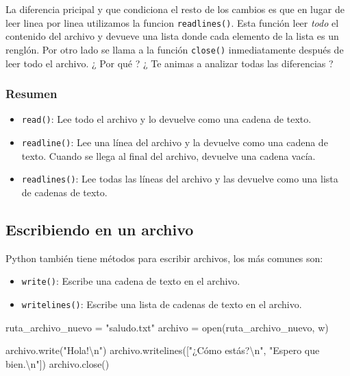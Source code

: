 \documentclass[
  letterpaper,
  DIV=11,
  numbers=noendperiod]{scrreprt}
\newenvironment{Shaded}{\begin{snugshade}}{\end{snugshade}}
\newcommand{\BuiltInTok}[1]{\textcolor[rgb]{0.00,0.23,0.31}{#1}}
\newcommand{\CharTok}[1]{\textcolor[rgb]{0.13,0.47,0.30}{#1}}
\newcommand{\NormalTok}[1]{\textcolor[rgb]{0.00,0.23,0.31}{#1}}
\newcommand{\OperatorTok}[1]{\textcolor[rgb]{0.37,0.37,0.37}{#1}}
\newcommand{\StringTok}[1]{\textcolor[rgb]{0.13,0.47,0.30}{#1}}
\providecommand{\tightlist}{%
  \setlength{\itemsep}{0pt}\setlength{\parskip}{0pt}}\usepackage{longtable,booktabs,array}
\begin{document}
La diferencia pricipal y que condiciona el resto de los cambios es que
en lugar de leer linea por linea utilizamos la funcion
\texttt{readlines()}. Esta función leer \emph{todo} el contenido del
archivo y devueve una lista donde cada elemento de la lista es un
renglón. Por otro lado se llama a la función \texttt{close()}
inmediatamente después de leer todo el archivo. ¿ Por qué ? ¿ Te animas
a analizar todas las diferencias ?

\subsubsection{Resumen}\label{resumen}

\begin{itemize}
\tightlist
\item
  \texttt{read()}: Lee todo el archivo y lo devuelve como una cadena de
  texto.
\item
  \texttt{readline()}: Lee una línea del archivo y la devuelve como una
  cadena de texto. Cuando se llega al final del archivo, devuelve una
  cadena vacía.
\item
  \texttt{readlines()}: Lee todas las líneas del archivo y las devuelve
  como una lista de cadenas de texto.
\end{itemize}

\subsection{Escribiendo en un archivo}\label{escribiendo-en-un-archivo}

Python también tiene métodos para escribir archivos, los más comunes
son:

\begin{itemize}
\tightlist
\item
  \texttt{write()}: Escribe una cadena de texto en el archivo.
\item
  \texttt{writelines()}: Escribe una lista de cadenas de texto en el
  archivo.
\end{itemize}

\begin{Shaded}
\begin{Highlighting}[]
\NormalTok{ruta\_archivo\_nuevo }\OperatorTok{=} \StringTok{"saludo.txt"}
\NormalTok{archivo }\OperatorTok{=} \BuiltInTok{open}\NormalTok{(ruta\_archivo\_nuevo, }\StringTok{\textquotesingle{}w\textquotesingle{}}\NormalTok{)}

\NormalTok{archivo.write(}\StringTok{"Hola!}\CharTok{\textbackslash{}n}\StringTok{"}\NormalTok{)}
\NormalTok{archivo.writelines([}\StringTok{"¿Cómo estás?}\CharTok{\textbackslash{}n}\StringTok{"}\NormalTok{, }\StringTok{"Espero que bien.}\CharTok{\textbackslash{}n}\StringTok{"}\NormalTok{])}
\NormalTok{archivo.close()}
\end{Highlighting}
\end{Shaded}
\end{document}
